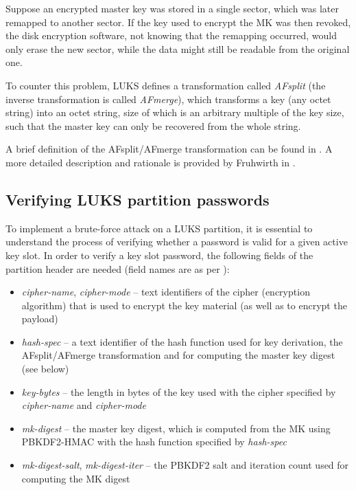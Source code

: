 \documentclass[12pt,oneside]{fithesis2}
\begin{document}
      Suppose an encrypted master key was stored in a single sector, which was later remapped to another sector. If the key used to encrypt the MK was then revoked, the disk encryption software, not knowing that the remapping occurred, would only erase the new sector, while the data might still be readable from the original one.
      
      To counter this problem, LUKS defines a transformation called \emph{AFsplit} (the inverse transformation is called \emph{AFmerge}), which transforms a key (any octet string) into an octet string, size of which is an arbitrary multiple of the key size, such that the master key can only be recovered from the whole string.
      
      A brief definition of the AFsplit/AFmerge transformation can be found in \cite[section 2.4]{luks}. A more detailed description and rationale is provided by Fruhwirth in \cite[section 5.2]{Fruhwirth}.
      
      \subsection{Verifying LUKS partition passwords}
      To implement a brute-force attack on a LUKS partition, it is essential to understand the process of verifying whether a password is valid for a given active key slot. In order to verify a key slot password, the following fields of the partition header are needed (field names are as per \cite{luks}):
      \begin{itemize}
        \item \emph{cipher-name}, \emph{cipher-mode} -- text identifiers of the cipher (encryption algorithm) that is used to encrypt the key material (as well as to encrypt the payload)
        \item \emph{hash-spec} -- a text identifier of the hash function used for key derivation, the AFsplit/AFmerge transformation and for computing the master key digest (see below)
        \item \emph{key-bytes} -- the length in bytes of the key used with the cipher specified by \emph{cipher-name} and \emph{cipher-mode}
        \item \emph{mk-digest} -- the master key digest, which is computed from the MK using PBKDF2-HMAC with the hash function specified by \emph{hash-spec}
        \item \emph{mk-digest-salt}, \emph{mk-digest-iter} -- the PBKDF2 salt and iteration count used for computing the MK digest
      \end{itemize}
      
\end{document}
